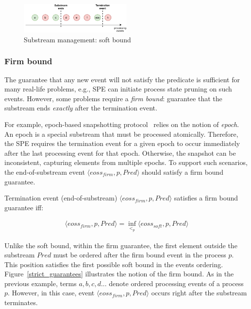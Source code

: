 \begin{figure}[t]
  \centering
  \includegraphics[width=0.50\textwidth]{pics/general-guarantee.pdf}
  \caption{Substream management: soft bound}
  \label{general_guarantees}
\end{figure}

\subsubsection{Firm bound}

The guarantee that any new event will not satisfy the predicate is sufficient for many real-life problems, e.g., SPE can initiate process state pruning on such events. However, some problems require a {\em firm bound}: guarantee that the substream ends {\em exactly} after the termination event. 

For example, epoch-based snapshotting protocol~\cite{2015arXiv150608603C, jacques2016consistent} relies on the notion of {\em epoch}. An epoch is a special substream that must be processed atomically. Therefore, the SPE requires the termination event for a given epoch to occur immediately after the last processing event for that epoch. Otherwise, the snapshot can be inconsistent, capturing elements from multiple epochs. To support such scenarios, the end-of-substream event $\langle eoss_{firm}, p, Pred\rangle$ should satisfy a firm bound guarantee.

\begin{definition}
Termination event (end-of-substream) $\langle eoss_{firm}, p, Pred\rangle$ satisfies a firm bound guarantee iff:

\begin{multline}
\langle eoss_{firm}, p, Pred\rangle = \inf_{<_p} \langle eoss_{soft}, p, Pred\rangle
\end{multline}
\end{definition}

Unlike the soft bound, within the firm guarantee, the first element outside the substream $Pred$ must be ordered after the firm bound event in the process $p$. This position satisfies the first possible soft bound in the events ordering. Figure~\ref{strict_guarantees} illustrates the notion of the firm bound. As in the previous example, terms $a,b,c,d...$ denote ordered processing events of a process $p$. However, in this case, event $\langle eoss_{firm}, p, Pred\rangle$ occurs right after the substream terminates.

